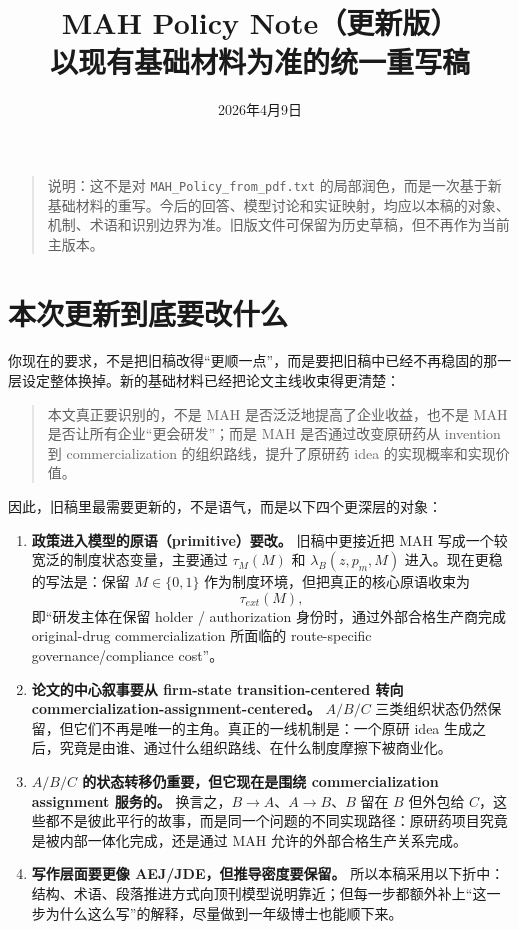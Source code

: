 \documentclass[12pt,fontset=none]{ctexart}
\title{MAH Policy Note（更新版）\\
以现有基础材料为准的统一重写稿}
\author{}
\date{2026年4月9日}
\begin{document}
\maketitle

\begin{quote}
说明：这不是对 \texttt{MAH\_Policy\_from\_pdf.txt} 的局部润色，而是一次基于新基础材料的重写。今后的回答、模型讨论和实证映射，均应以本稿的对象、机制、术语和识别边界为准。旧版文件可保留为历史草稿，但不再作为当前主版本。
\end{quote}

\section{本次更新到底要改什么}

你现在的要求，不是把旧稿改得“更顺一点”，而是要把旧稿中已经不再稳固的那一层设定整体换掉。新的基础材料已经把论文主线收束得更清楚：

\begin{quote}
本文真正要识别的，不是 MAH 是否泛泛地提高了企业收益，也不是 MAH 是否让所有企业“更会研发”；而是 MAH 是否通过改变原研药从 invention 到 commercialization 的组织路线，提升了原研药 idea 的实现概率和实现价值。
\end{quote}

因此，旧稿里最需要更新的，不是语气，而是以下四个更深层的对象：

\begin{enumerate}
    \item \textbf{政策进入模型的原语（primitive）要改。} 旧稿中更接近把 MAH 写成一个较宽泛的制度状态变量，主要通过 $\tau_M(M)$ 和 $\lambda_B(z,p_m,M)$ 进入。现在更稳的写法是：保留 $M\in\{0,1\}$ 作为制度环境，但把真正的核心原语收束为
    \[
    \tau_{ext}(M),
    \]
    即“研发主体在保留 holder / authorization 身份时，通过外部合格生产商完成 original-drug commercialization 所面临的 route-specific governance/compliance cost”。

    \item \textbf{论文的中心叙事要从 firm-state transition-centered 转向 commercialization-assignment-centered。} $A/B/C$ 三类组织状态仍然保留，但它们不再是唯一的主角。真正的一线机制是：一个原研 idea 生成之后，究竟是由谁、通过什么组织路线、在什么制度摩擦下被商业化。

    \item \textbf{$A/B/C$ 的状态转移仍重要，但它现在是围绕 commercialization assignment 服务的。} 换言之，$B\to A$、$A\to B$、$B$ 留在 $B$ 但外包给 $C$，这些都不是彼此平行的故事，而是同一个问题的不同实现路径：原研药项目究竟是被内部一体化完成，还是通过 MAH 允许的外部合格生产关系完成。

    \item \textbf{写作层面要更像 AEJ/JDE，但推导密度要保留。} 所以本稿采用以下折中：结构、术语、段落推进方式向顶刊模型说明靠近；但每一步都额外补上“这一步为什么这么写”的解释，尽量做到一年级博士也能顺下来。
\end{enumerate}
\end{document}
